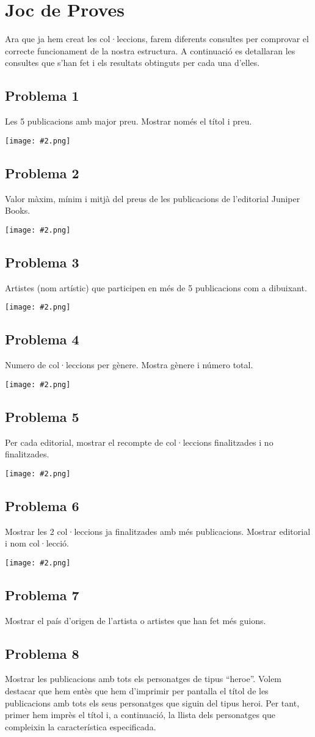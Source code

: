 \documentclass{article}
\newcommand{\imatge}[2]{
\begin{center}
    \texttt{[image: \#2.png]}
\end{center}
}
\begin{document}
\section{Joc de Proves}
Ara que ja hem creat les col·leccions, farem diferents consultes per comprovar el correcte funcionament de la nostra estructura. A continuaci\'o es detallaran les consultes que s'han fet i els resultats obtinguts per cada una d'elles.
\subsection*{Problema 1}
Les 5 publicacions amb major preu. Mostrar només el títol i preu.
\imatge{1}{1}
\subsection*{Problema 2}
Valor màxim, mínim i mitjà del preus de les publicacions de l’editorial Juniper Books.
\imatge{1}{2}
\subsection*{Problema 3}
Artistes (nom artístic) que participen en més de 5 publicacions com a dibuixant.
\imatge{1}{3}
\subsection*{Problema 4}
Numero de col·leccions per gènere. Mostra gènere i número total.
\imatge{1}{4}
\subsection*{Problema 5}
Per cada editorial, mostrar el recompte de col·leccions finalitzades i no finalitzades.
\imatge{1}{5}
\subsection*{Problema 6}
Mostrar les 2 col·leccions ja finalitzades amb més publicacions. Mostrar editorial i nom col·lecció.
\imatge{1}{6}
\subsection*{Problema 7}
Mostrar el país d’origen de l’artista o artistes que han fet més guions.
\subsection*{Problema 8}
Mostrar les publicacions amb tots els personatges de tipus “heroe”. Volem destacar que hem entès que hem d'imprimir per pantalla el títol de les publicacions amb tots els seus personatges que siguin del tipus heroi. Per tant, primer hem imprès el títol i, a continuació, la llista dels personatges que compleixin la característica especificada.
\end{document}
